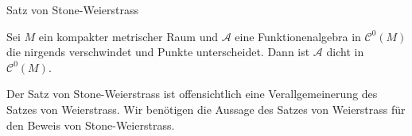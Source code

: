 \begin{frame}{Satz von Stone-Weierstrass}
    \begin{satz}
        Sei \(M\) ein kompakter metrischer Raum und \( \mathcal{A} \) eine 
        Funktionenalgebra in \( \mathcal{C}^0(M) \) die nirgends verschwindet und 
        Punkte unterscheidet. 
        Dann ist \( \mathcal{A} \) dicht in \( \mathcal{C}^0(M) \).
    \end{satz}
    \pause
    \begin{bem}
        Der Satz von Stone-Weierstrass ist offensichtlich eine Verallgemeinerung 
        des Satzes von Weierstrass. 
        Wir benötigen die Aussage des Satzes von Weierstrass für den Beweis von Stone-Weierstrass.
    \end{bem}
\end{frame}